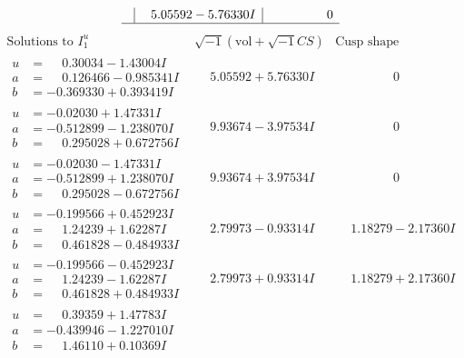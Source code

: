 \documentclass[1p]{elsarticle_modified}
\theoremstyle{definition}
\newcommand{\I}{\sqrt{-1}}
\begin{document}
$$\begin{array}{c|c|c}
 & \phantom{-}5.05592 - 5.76330 I & \phantom{-0.000000 } 0\\
 \hline 
 \end{array}$$\newpage$$\begin{array}{c|c|c}  
\text{Solutions to }I^u_{1}& \I (\text{vol} + \sqrt{-1}CS) & \text{Cusp shape}\\
 \hline 
\begin{aligned}
u &= \phantom{-}0.30034 - 1.43004 I \\
a &= \phantom{-}0.126466 - 0.985341 I \\
b &= -0.369330 + 0.393419 I\end{aligned}
 & \phantom{-}5.05592 + 5.76330 I & \phantom{-0.000000 } 0 \\ \hline\begin{aligned}
u &= -0.02030 + 1.47331 I \\
a &= -0.512899 - 1.238070 I \\
b &= \phantom{-}0.295028 + 0.672756 I\end{aligned}
 & \phantom{-}9.93674 - 3.97534 I & \phantom{-0.000000 } 0 \\ \hline\begin{aligned}
u &= -0.02030 - 1.47331 I \\
a &= -0.512899 + 1.238070 I \\
b &= \phantom{-}0.295028 - 0.672756 I\end{aligned}
 & \phantom{-}9.93674 + 3.97534 I & \phantom{-0.000000 } 0 \\ \hline\begin{aligned}
u &= -0.199566 + 0.452923 I \\
a &= \phantom{-}1.24239 + 1.62287 I \\
b &= \phantom{-}0.461828 - 0.484933 I\end{aligned}
 & \phantom{-}2.79973 - 0.93314 I & \phantom{-}1.18279 - 2.17360 I \\ \hline\begin{aligned}
u &= -0.199566 - 0.452923 I \\
a &= \phantom{-}1.24239 - 1.62287 I \\
b &= \phantom{-}0.461828 + 0.484933 I\end{aligned}
 & \phantom{-}2.79973 + 0.93314 I & \phantom{-}1.18279 + 2.17360 I \\ \hline\begin{aligned}
u &= \phantom{-}0.39359 + 1.47783 I \\
a &= -0.439946 - 1.227010 I \\
b &= \phantom{-}1.46110 + 0.10369 I\end{aligned}

\end{array}$$
\end{document}
